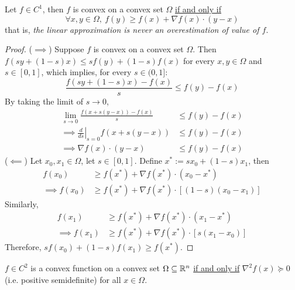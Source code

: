\documentclass{article}
\begin{document}
    \begin{theorem}
        Let $f \in C^1$, then $f$ is convex on a convex set $\Omega$ \ul{if and only if}
        \begin{equation}
            \forall x, y \in \Omega,\ f(y) \geq f(x) + \nabla f(x) \cdot (y - x)
        \end{equation}
        that is, \emph{the linear approximation is never an overestimation of value of $f$}.
    \end{theorem}
    \begin{proof}
        ($\implies$) Suppose $f$ is convex on a convex set $\Omega$. Then $f(sy + (1-s) x) \leq sf(y) + (1-s)f(x)$ for every $x, y \in \Omega$ and $s \in [0, 1]$, which implies, for every $s \in (0, 1]$:
        \begin{equation}
            \frac{f(sy + (1-s) x) - f(x)}{s} \leq f(y) - f(x)
        \end{equation}
        By taking the limit of $s \to 0$,
        \begin{align}
            \lim_{s \to 0} \frac{f(x + s(y-x)) - f(x)}{s} &\leq f(y) - f(x) \\
            \implies \left.\frac{d}{ds}\right\vert_{s=0} f(x + s(y-x)) &\leq f(y) - f(x) \\
            \implies \nabla f(x) \cdot (y-x) &\leq f(y) - f(x)
        \end{align}
        ($\impliedby$) Let $x_0, x_1 \in \Omega$, let $s \in [0, 1]$. Define $x^* := s x_0 + (1-s) x_1$, then 
        \begin{align}
        	f(x_0) &\geq f(x^*) + \nabla f(x^*) \cdot (x_0 - x^*) \\
        	\implies f(x_0) &\geq f(x^*) + \nabla f(x^*) \cdot [(1-s)(x_0 - x_1)]
        \end{align}
        Similarly,
        \begin{align}
        	f(x_1) &\geq f(x^*) + \nabla f(x^*) \cdot (x_1 - x^*) \\
        	\implies f(x_1) &\geq f(x^*) + \nabla f(x^*) \cdot [s(x_1 - x_0)]
        \end{align}
        Therefore, $sf(x_0) + (1-s)f(x_1) \geq f(x^*)$.
    \end{proof}
    
    \begin{theorem}
        $f \in C^2$ is a convex function on a convex set $\Omega \subseteq \mathbb{R}^n$ \ul{if and only if} $\nabla^2 f(x) \succcurlyeq 0$ (i.e. positive semidefinite) for all $x \in \Omega$.
    \end{theorem}
    
\end{document}
